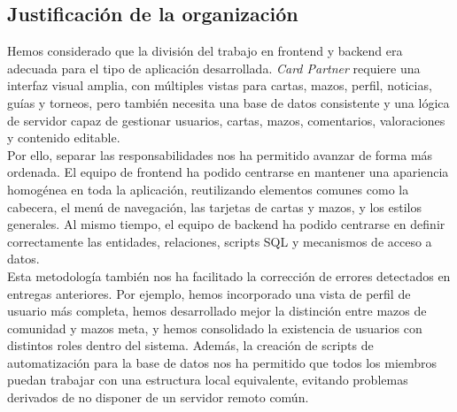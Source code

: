 \documentclass[10pt]{article}
\begin{document}
    \subsection{Justificación de la organización}
        Hemos considerado que la división del trabajo en frontend y backend era adecuada para el tipo de aplicación desarrollada. \textit{Card Partner} requiere una interfaz visual amplia, con múltiples vistas para cartas, mazos, perfil, noticias, guías y torneos, pero también necesita una base de datos consistente y una lógica de servidor capaz de gestionar usuarios, cartas, mazos, comentarios, valoraciones y contenido editable.\\
        
        Por ello, separar las responsabilidades nos ha permitido avanzar de forma más ordenada. El equipo de frontend ha podido centrarse en mantener una apariencia homogénea en toda la aplicación, reutilizando elementos comunes como la cabecera, el menú de navegación, las tarjetas de cartas y mazos, y los estilos generales. Al mismo tiempo, el equipo de backend ha podido centrarse en definir correctamente las entidades, relaciones, scripts SQL y mecanismos de acceso a datos.\\
        
        Esta metodología también nos ha facilitado la corrección de errores detectados en entregas anteriores. Por ejemplo, hemos incorporado una vista de perfil de usuario más completa, hemos desarrollado mejor la distinción entre mazos de comunidad y mazos meta, y hemos consolidado la existencia de usuarios con distintos roles dentro del sistema. Además, la creación de scripts de automatización para la base de datos nos ha permitido que todos los miembros puedan trabajar con una estructura local equivalente, evitando problemas derivados de no disponer de un servidor remoto común.


        
        
\end{document}
